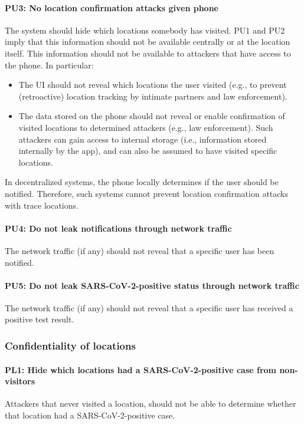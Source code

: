 \paragraph{PU3: No location confirmation attacks given phone} The system should hide which locations somebody has visited. PU1 and PU2 imply that this information should not be available centrally or at the location itself. This information should not be available to attackers that have access to the phone. In particular:
\begin{itemize}
 \item The UI should not reveal which locations the user visited (e.g., to prevent (retroactive) location tracking by intimate partners and law enforcement).
 \item The data stored on the phone should not reveal or enable confirmation of visited locations to determined attackers (e.g., law enforcement). Such attackers can gain access to internal storage (i.e., information stored internally by the app), and can also be assumed to have visited specific locations.
\end{itemize}
 
 In decentralized systems, the phone locally determines if the user should be notified. Therefore, such systems cannot prevent location confirmation attacks with trace locations.

\paragraph{PU4: Do not leak notifications through network traffic} The network traffic (if any) should not reveal that a specific user has been notified.

\paragraph{PU5: Do not leak SARS-CoV-2-positive status through network traffic} The network traffic (if any) should not reveal that a specific user has received a positive test result.

\subsubsection{Confidentiality of locations}
\paragraph{PL1: Hide which locations had a SARS-CoV-2-positive case from non-visitors} Attackers that never visited a location, should not be able to determine whether that location had a SARS-CoV-2-positive case.

